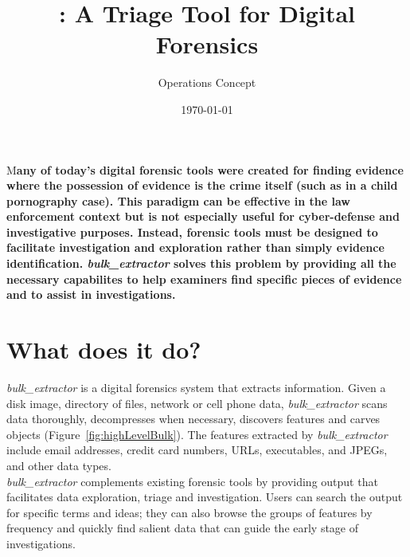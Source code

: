 \documentclass[DIV=calc, paper=a4, fontsize=11pt]{article}	 %
\title{\bulk: A Triage Tool for Digital Forensics} %
\author{Operations Concept} %
\date{\today} %
\newcommand \bulk {\textit{bulk\_extractor}\xspace}
\newcommand{\initial}[1]{ %
\lettrine[lines=3,lhang=0.3,nindent=0em]{
\color{LightBlue}
{\textsf{#1}}}{}}
\begin{document}
\maketitle %

\noindent{}

\thispagestyle{fancy} %


\initial{M}\textbf{any of today's digital forensic tools were created for finding evidence where the possession of evidence is the  crime itself (such as in a child pornography case). This paradigm can be effective in the law enforcement context but is not especially useful for cyber-defense and investigative purposes. Instead, forensic tools must be designed to facilitate investigation and exploration rather than simply evidence identification\cite{Next10Years}. \bulk solves this problem by providing all the necessary capabilites to help examiners find specific pieces of evidence and to assist in investigations.}

\section*{What does it do?}
\bulk is a digital forensics system that extracts information. Given a disk image, directory of files, network or cell phone data, \bulk scans data thoroughly, decompresses when necessary, discovers features and carves objects (Figure~\ref{fig:highLevelBulk}). The features extracted by \bulk include email addresses, credit card numbers, URLs, executables, and JPEGs, and other data types.\\

\noindent
\bulk complements existing forensic tools  by providing output that facilitates data exploration, triage and investigation. Users can search the output for specific terms and ideas; they can also browse the groups of features by frequency and quickly find salient data that can guide the early stage of investigations.
\end{document}
